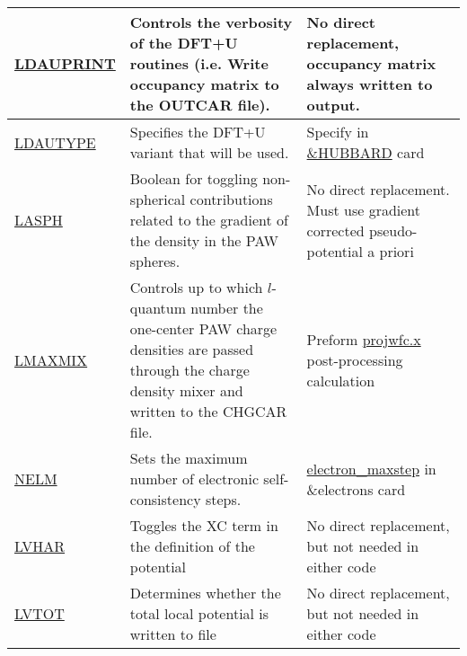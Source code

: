 \documentclass[12pt]{article}
\begin{document}
\begin{center}
\begin{table}[ht]
\begin{tabularx}{\linewidth}{|>{\RaggedRight}p{2.5cm}|x|x|}
 \href{https://www.vasp.at/wiki/index.php/LDAUPRINT}{LDAUPRINT} &
 Controls the verbosity of the DFT+U routines (i.e. Write occupancy matrix to the OUTCAR file). &
 No direct replacement, occupancy matrix always written to output. \\ \hline
 
 \href{https://www.vasp.at/wiki/index.php/LDAUTYPE}{LDAUTYPE} &
 Specifies the DFT+U variant that will be used. &
 Specify in \href{https://www.quantum-espresso.org/Doc/INPUT_PW.html#idm1699}{\&HUBBARD} card \\ \hline
 
 \href{https://www.vasp.at/wiki/index.php/LASPH}{LASPH} &
 Boolean for toggling non-spherical contributions related to the gradient of the density in the PAW spheres. &
 No direct replacement. Must use gradient corrected pseudo-potential a priori \\ \hline
 
 \href{https://www.vasp.at/wiki/index.php/LMAXMIX}{LMAXMIX} &
 Controls up to which $l$-quantum number the one-center PAW charge densities are passed through the charge density mixer and written to the CHGCAR file. &
 Preform \href{https://www.quantum-espresso.org/Doc/INPUT_PROJWFC.html}{projwfc.x} post-processing calculation \\ \hline
 
 \href{https://www.vasp.at/wiki/index.php/NELM}{NELM} &
 Sets the maximum number of electronic self-consistency steps. &
 \href{https://www.quantum-espresso.org/Doc/INPUT_PW.html#idm78}{electron\_maxstep} in \&electrons card \\ \hline
 
 \href{https://www.vasp.at/wiki/index.php/LVHAR}{LVHAR} &
 Toggles the XC term in the definition of the potential &
 No direct replacement, but not needed in either code \\ \hline
 
 \href{https://www.vasp.at/wiki/index.php/LVTOT}{LVTOT} &
 Determines whether the total local potential is written to file &
 No direct replacement, but not needed in either code \\ \hline
 
\end{tabularx}
\end{table}
\end{center}
\end{document}
